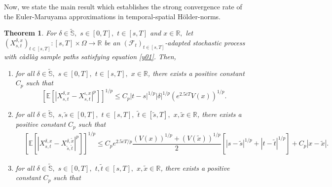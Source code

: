\documentclass[11pt]{article}
\theoremstyle{theorem}
\newtheorem{Thm}[Def]{Theorem}
\theoremstyle{definition}
\newtheorem{Rem}[Def]{Remark}
\newcommand{\bR}{\mathbb{R}}
\newcommand{\mf}{\mathcal{F}}
\newcommand{\1}{{\bf 1}}
\begin{document}
Now, we state the main result which establishes the strong convergence rate of the Euler-Maruyama approximations in temporal-spatial H\"older-norms.
\begin{Thm} \label{Thm} 
For $ \delta \in \widetilde{\mathbb{S}},$ $s\in [0, T],$ $t \in [s, T]$  and $ x\in \bR,$ let $(X^{\delta,x}_{s,t})_{t\in[s,T]}:[s,T]  \times\Omega\to\mathbb{R} $ 
be an $(\mf_t)_{t\in[s,T]}$-adapted stochastic process with c\`adl\`ag  sample paths satisfying equation \eqref{y01}. 
Then, 
\begin{enumerate}
    \item [\textup{(i)}] for all $\delta \in \widetilde{\mathbb{S}},$ $ s\in [0, T],$ $t\in [s, T],$ $ x \in \bR$, there exists a positive constant $C_p$ such that $$\left[\mathbb{E}\left[\left|X^{\delta, x}_{s,t}-X^{\iota, x}_{s,t}\right|^p\right]\right]^{1/p}\leq C_p |t-s|^{1/p} |\delta|^{1/p} (e^{2.5\overline{c}T}V(x))^{1/p}.$$
    \item [\textup{(ii)}] for all $\delta \in \widetilde{\mathbb{S}},$ $ s, \widetilde{s} \in [0, T],$ $t\in [s, T],$ $\widetilde{t} \in [\widetilde{s}, T],$ $ x, \widetilde{x} \in \bR$, there exists a positive constant $C_p$ such that 
    \begin{align*}
&\left[\mathbb{E}\left[\left|X^{\delta, x}_{s,t}-X^{\delta, \widetilde{x}}_{\widetilde{s},\widetilde{t}}\right|^p\right]\right]^{1/p}  \leq C_p e^{2.5\overline{c}T/p} \dfrac{(V(x))^{1/p} + (V(\widetilde{x}))^{1/p}}{2} \left[|s-\widetilde{s} |^{1/p} + |t-\widetilde{t} |^{1/p}\right] + C_p|x-\widetilde{x}|.\end{align*}
    \item [\textup{(iii)}]  for all $\delta \in \widetilde{\mathbb{S}},$ $ s \in [0, T],$ $t, \widetilde{t} \in [s, T],$ $ x, \widetilde{x} \in \bR$, there exists a positive constant $C_p$ such that \begin{align*}

\end{align*}
\end{enumerate}
\end{Thm}
\end{document}
